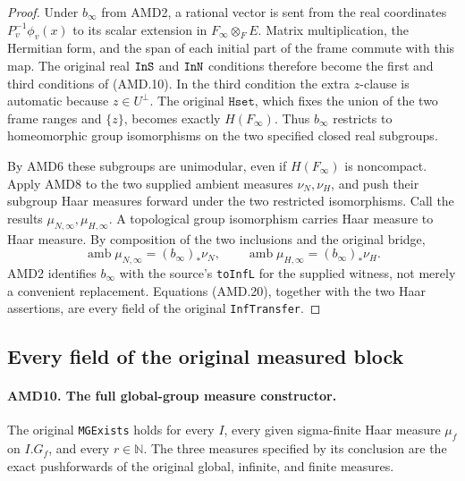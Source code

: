 \documentclass[11pt,a4paper]{article}
\numberwithin{equation}{section}
\theoremstyle{remark}\newtheorem{remark}[theorem]{Remark}
\begin{document}
\begin{proof}
Under \(b_\infty\) from AMD2, a rational vector is sent from
the real coordinates \(P_v^{-1}\phi_v(x)\) to its scalar
extension in \(F_\infty\otimes_F E\).  Matrix multiplication,
the Hermitian form, and the span of each initial part of the
frame commute with this map.  The original real \(\texttt{In\allowbreak S}\)
and \(\texttt{In\allowbreak N}\) conditions therefore become the first
and third conditions of (AMD.10).  In the third condition the
extra \(z\)-clause is automatic because \(z\in U^\perp\).
The original \(\texttt{Hset}\), which fixes the union of the
two frame ranges and \(\{z\}\), becomes exactly \(H(F_\infty)\).
Thus \(b_\infty\) restricts to homeomorphic group isomorphisms
on the two specified closed real subgroups.

By AMD6 these subgroups are unimodular, even if \(H(F_\infty)\)
is noncompact.  Apply AMD8 to the two supplied ambient measures
\(\nu_N,\nu_H\), and push their subgroup Haar measures forward
under the two restricted isomorphisms.  Call the results
\(\mu_{N,\infty},\mu_{H,\infty}\).  A topological group
isomorphism carries Haar measure to Haar measure.  By composition
of the two inclusions and the original bridge,
\[
 \operatorname{amb}\mu_{N,\infty}=(b_\infty)_*\nu_N,
 \qquad
 \operatorname{amb}\mu_{H,\infty}=(b_\infty)_*\nu_H.
 \tag{AMD.20}
\]
AMD2 identifies \(b_\infty\) with the source's \texttt{to\allowbreak Inf\allowbreak L}
for the supplied witness, not merely a convenient replacement.
Equations (AMD.20), together with the two Haar assertions, are
every field of the original \texttt{Inf\allowbreak Transfer}.
\end{proof}

\subsection{Every field of the original measured block}

\paragraph{AMD10. The full global-group measure constructor.}
\label{claim:AMD10}
The original \texttt{MGExists} holds for every \(I\), every
given sigma-finite Haar measure \(\mu_f\) on \(I.G_f\), and
every \(r\in\mathbb N\).  The three measures specified by
its conclusion are the exact pushforwards of the original
global, infinite, and finite measures.
\end{document}
